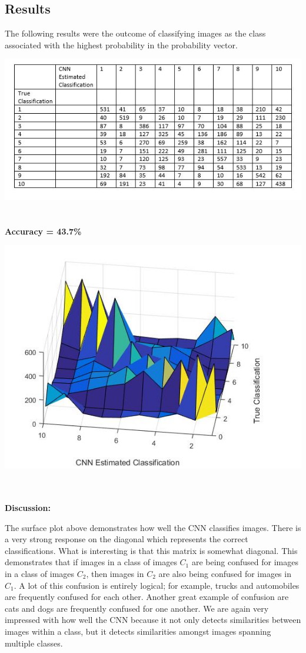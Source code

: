\documentclass[11pt,english]{article}
\begin{document}
\subsection{Results}
	The following results were the outcome of classifying images as the class associated with the highest probability in the probability vector.
\begin{center}
	\includegraphics[scale=0.7]{confusionmatrix}
	~\\~\\
	
		\textbf{Accuracy = 43.7\%}
\end{center}


\begin{center}
	\includegraphics[scale=0.6]{confsurf}
	~\\~\\
\end{center}
\textbf{Discussion:}

	
   The surface plot above demonstrates how well the CNN classifies images. There is a very strong response on the diagonal which represents the correct classifications. What is interesting is that this matrix is somewhat diagonal. This demonstrates that if images in a class of images $C_1$ are being confused for images in a class of images $C_2$, then images in $C_2$ are also being confused for images in $C_1$. A lot of this confusion is entirely logical; for example, trucks and automobiles are frequently confused for each other. Another great example of confusion are cats and dogs are frequently confused for one another. We are again very impressed with how well the CNN because it not only detects similarities between images within a class, but it detects similarities amongst images spanning multiple classes.
       
\end{document}
